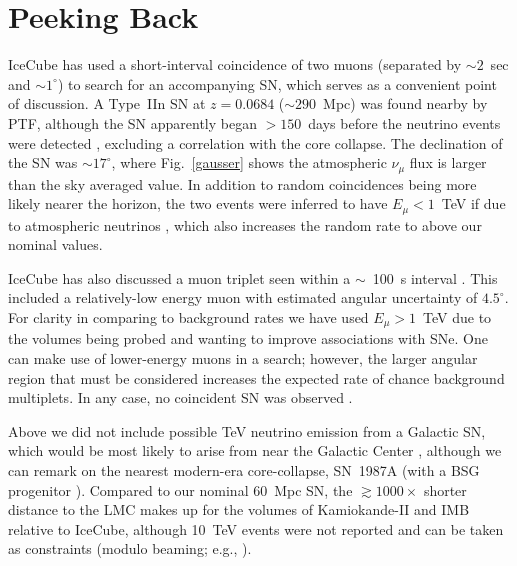 \documentclass[aps,prd,nofootinbib,twocolumn,floatfix,letterpaper,superscriptaddress,showpacs]{revtex4}
\begin{document}
\section{Peeking Back}
%
IceCube has used a short-interval coincidence of two muons (separated by $\sim\!2$~sec and $\sim\!1^\circ$) to search for an accompanying SN, which serves as a convenient point of discussion.  A Type~IIn SN at $z \!=\! 0.0684$ ($\sim\! 290$~Mpc) was found nearby by PTF, although the SN apparently began $>\!150$~days before the neutrino events were detected \cite{Aartsen2015c}, excluding a correlation with the core collapse.
The declination of the SN was $\sim\! 17^\circ$, where Fig.~\ref{gausser} shows the atmospheric $\nu_\mu$ flux is larger than the sky averaged value.  In addition to random coincidences being more likely nearer the horizon, the two events were inferred to have $E_\mu \!<\! 1$~TeV if due to atmospheric neutrinos \cite{Aartsen2015c}, which also increases the random rate to above our nominal values.

IceCube has also discussed a muon triplet seen within a $\sim$~100~s interval \cite{Aartsen:2017snx}.  This included a relatively-low energy muon with estimated angular uncertainty of $4.5^\circ$.
For clarity in comparing to background rates we have used $E_\mu \!>\! 1$~TeV due to the volumes being probed and wanting to improve associations with SNe.
One can make use of lower-energy muons in a search; however, the larger angular region that must be considered increases the expected rate of chance background multiplets.  In any case, no coincident SN was observed \cite{Aartsen:2017snx}.


Above we did not include possible TeV neutrino emission from a Galactic SN, which would be most likely to arise from near the Galactic Center \cite{OLeary:2015qpx}, although we can remark on the nearest modern-era core-collapse, SN~1987A (with a BSG progenitor \cite{Arnett:1990au}).  Compared to our nominal 60~Mpc SN, the $\gtrsim\! 1000 \times$ shorter distance to the LMC makes up for the volumes of Kamiokande-II and IMB relative to IceCube, although 10~TeV events were not reported \cite{Oyama:1987aw,BeckerSzendy:1995vr} and can be taken as constraints (modulo beaming; e.g., \cite{Rees1987,Piran:1987gh,Colgate:1987an}).




\end{document}

